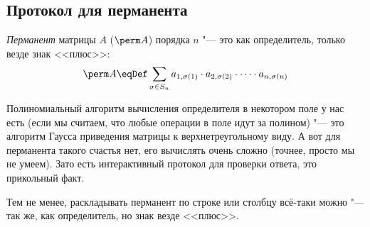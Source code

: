 \subsection{Протокол для перманента}
	\begin{Def}
		\textit{Перманент} матрицы $A$ ($\perm A$) порядка $n$ "--- это как определитель, только везде знак <<плюс>>:
		\[
			\perm A \eqDef \sum_{\sigma \in S_n} a_{1,\sigma(1)} \cdot a_{2,\sigma(2)} \cdot \dots \cdot a_{n,\sigma(n)}
		\]
	\end{Def}
	\begin{Rem}
		Полиномиальный алгоритм вычисления определителя в некотором поле у нас есть (если мы считаем, что любые операции в поле идут за полином) "--- это алгоритм Гаусса
		приведения матрицы к верхнетреугольному виду.
		А вот для перманента такого счастья нет, его вычислять очень сложно (точнее, просто мы не умеем).
		Зато есть интерактивный протокол для проверки ответа, это прикольный факт.
	\end{Rem}
	\begin{Rem}
		Тем не менее, раскладывать перманент по строке или столбцу всё-таки можно "--- так же, как определитель, но знак везде <<плюс>>.
	\end{Rem}

